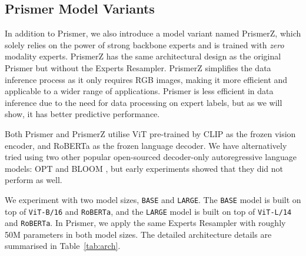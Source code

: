 \documentclass[11pt]{article}
\begin{document}
{\subsection{Prismer Model Variants}
In addition to Prismer, we also introduce a model variant named PrismerZ, which solely relies on the power of strong backbone experts and is trained with {\it zero} modality experts. PrismerZ has the same architectural design as the original Prismer but without the Experts Resampler. PrismerZ simplifies the data inference process as it only requires RGB images, making it more efficient and applicable to a wider range of applications. Prismer is less efficient in data inference due to the need for data processing on expert labels, but as we will show, it has better predictive performance.

Both Prismer and PrismerZ utilise ViT \cite{dosovitskiy2020vit} pre-trained by CLIP \cite{radford2021clip} as the frozen vision encoder, and RoBERTa \cite{liu2019roberta} as the frozen language decoder. We have alternatively tried using two other popular open-sourced decoder-only autoregressive language models: OPT \cite{zhang2022opt} and BLOOM \cite{scao2022bloom}, but early experiments showed that they did not perform as well.

We experiment with two model sizes, {\tt BASE} and {\tt LARGE}. The {\tt BASE} model is built on top of {\tt ViT-B/16} and {\tt RoBERTa}, and the {\tt LARGE} model is built on top of {\tt ViT-L/14} and {\tt RoBERTa}. In Prismer, we apply the same Experts Resampler with roughly 50M parameters in both model sizes. The detailed architecture details are summarised in Table~\ref{tab:arch}.


}
\end{document}
